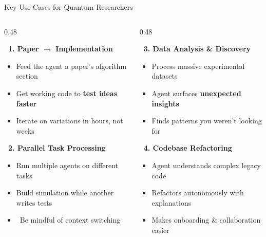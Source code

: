 \documentclass[aspectratio=169]{beamer}
\begin{document}
\begin{frame}{Key Use Cases for Quantum Researchers}

\begin{columns}[T]
\begin{column}{0.48\textwidth}

\textbf{\textcolor{quantumBlue}{\faFileAlt\ 1. Paper $\rightarrow$ Implementation}}
\vspace{0.1cm}
\begin{itemize}
    \item Feed the agent a paper's algorithm section
    \item Get working code to \textbf{test ideas faster}
    \item Iterate on variations in hours, not weeks
\end{itemize}
\vspace{0.2cm}

\textbf{\textcolor{quantumBlue}{\faTasks\ 2. Parallel Task Processing}}
\vspace{0.1cm}
\begin{itemize}
    \item Run multiple agents on different tasks
    \item Build simulation while another writes tests
    \item \textcolor{claudeOrange}{\small\faExclamationTriangle\ Be mindful of context switching}
\end{itemize}

\end{column}

\begin{column}{0.48\textwidth}

\textbf{\textcolor{quantumBlue}{\faDatabase\ 3. Data Analysis \& Discovery}}
\vspace{0.1cm}
\begin{itemize}
    \item Process massive experimental datasets
    \item Agent surfaces \textbf{unexpected insights}
    \item Finds patterns you weren't looking for
\end{itemize}
\vspace{0.2cm}

\textbf{\textcolor{quantumBlue}{\faCode\ 4. Codebase Refactoring}}
\vspace{0.1cm}
\begin{itemize}
    \item Agent understands complex legacy code
    \item Refactors autonomously with explanations
    \item Makes onboarding \& collaboration easier
\end{itemize}


\end{column}
\end{columns}
\end{frame}
\end{document}
